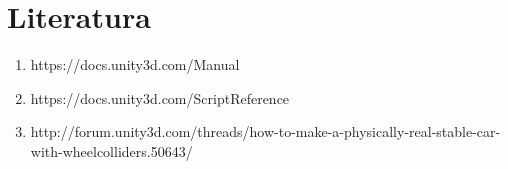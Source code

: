 \section{Literatura}
\begin{enumerate}
	\item https://docs.unity3d.com/Manual
	\item https://docs.unity3d.com/ScriptReference
	\item http://forum.unity3d.com/threads/how-to-make-a-physically-real-stable-car-with-wheelcolliders.50643/
\end{enumerate}